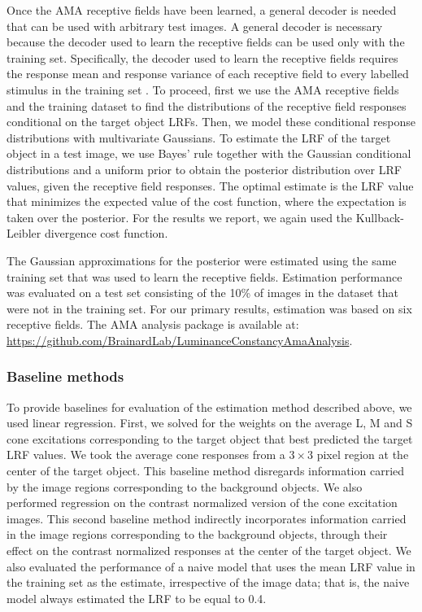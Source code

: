 \documentclass{jov}
\begin{document}
Once the AMA receptive fields have been learned, a general decoder is needed that can be used with arbitrary test images.
A general decoder is necessary because the decoder used to learn the receptive fields can be used only with the training set. Specifically, the decoder used to learn the receptive fields requires the response mean and response variance of each receptive field to every labelled stimulus in the training set \cite{geisler2009optimal,burge2017accuracy}.
To proceed, first we use the AMA receptive fields and the training dataset to find the distributions of the receptive field responses conditional on the target object LRFs.
Then, we model these conditional response distributions with multivariate Gaussians.
To estimate the LRF of the target object in a test image, we use Bayes' rule together with the Gaussian conditional distributions and a uniform prior to obtain the posterior distribution over LRF values, given the receptive field responses.
The optimal estimate is the LRF value that minimizes the expected value of the cost function, where the expectation is taken over the posterior.
For the results we report, we again used the Kullback-Leibler divergence cost function.

The Gaussian approximations for the posterior were estimated using the same training set that was used to learn the receptive fields.
Estimation performance was evaluated on a test set consisting of the 10\% of images in the dataset that were not in the training set.
For our primary results, estimation was based on six receptive fields.
The AMA analysis package is available at: \href{https://github.com/BrainardLab/LuminanceConstancyAmaAnalysis}{https://github.com/BrainardLab/LuminanceConstancyAmaAnalysis}.

\subsubsection*{Baseline methods}
To provide baselines for evaluation of the estimation method described above, we used linear regression.
First, we solved for the weights on the average L, M and S cone excitations corresponding to the target object that best predicted the target LRF values.
We took the average cone responses from a $3 \times 3$ pixel region at the center of the target object.
This baseline method disregards information carried by the image regions corresponding to the background objects.
We also performed regression on the contrast normalized version of the cone excitation images.
This second baseline method indirectly incorporates information carried in the image regions corresponding to the background objects,
through their effect on the contrast normalized responses at the center of the target object. 
We also evaluated the performance of a naive model that uses the mean LRF value in the training set as the estimate, irrespective
of the image data; that is, the naive model always estimated the LRF to be equal to 0.4.
\end{document}
